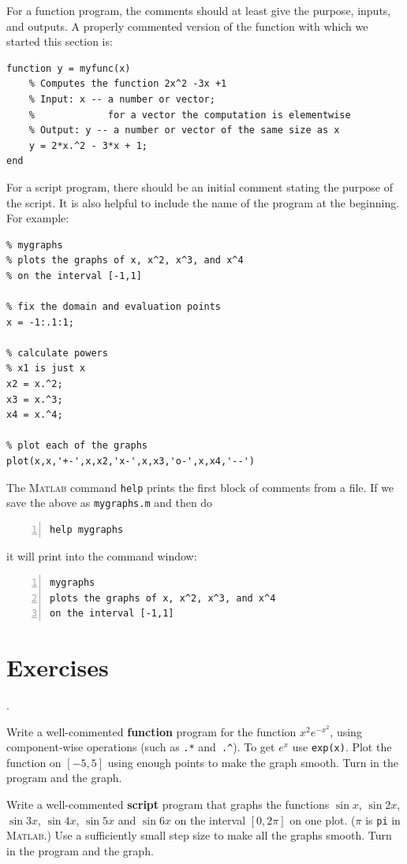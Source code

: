 For a function program, the comments should at least give the purpose,
inputs, and outputs. A properly commented version of the function with
which we started this section is:
\begin{lstlisting}
function y = myfunc(x)
    % Computes the function 2x^2 -3x +1
    % Input: x -- a number or vector; 
    %             for a vector the computation is elementwise
    % Output: y -- a number or vector of the same size as x
    y = 2*x.^2 - 3*x + 1;
end
\end{lstlisting}

For a script program, there should be an initial comment stating the purpose of the script.
It is also  helpful to include the name of the program at the beginning.
For example:
\begin{lstlisting}
% mygraphs
% plots the graphs of x, x^2, x^3, and x^4
% on the interval [-1,1]

% fix the domain and evaluation points
x = -1:.1:1;

% calculate powers
% x1 is just x
x2 = x.^2;
x3 = x.^3;
x4 = x.^4;

% plot each of the graphs
plot(x,x,'+-',x,x2,'x-',x,x3,'o-',x,x4,'--')
\end{lstlisting}

The \textsc{Matlab} command \verb&help& prints the first block of
comments from a file. If we save the above as \verb&mygraphs.m& and
then do
\begin{lstlisting}[frame=none,numbers=left]
help mygraphs
\end{lstlisting}
it will print into the command window:
\begin{lstlisting}[frame=none,numbers=left]
mygraphs
plots the graphs of x, x^2, x^3, and x^4
on the interval [-1,1]
\end{lstlisting}


\section*{Exercises}

\begin{list}
{.}{}
\item Write a well-commented {\bf function} program for the function
  $x^2 e^{-x^2}$, using component-wise operations (such as \verb&.*&
  and~\verb&.^&). To get $e^x$ use \verb&exp(x)&.  Plot the function
  on $[-5,5]$ using enough points to make the graph smooth. Turn in
  the program and the graph.

\item Write a well-commented {\bf script} program that graphs the
  functions $\sin x$, $\sin 2x$, $\sin 3x$, $\sin 4x$, $\sin 5x$ and
  $\sin 6x$ on the interval $[0, 2\pi]$ on one plot. ($\pi$ is
  \verb&pi& in \textsc{Matlab}.) Use a sufficiently small step size to
  make all the graphs smooth. 
  Turn in the program and the graph.
\end{list}





